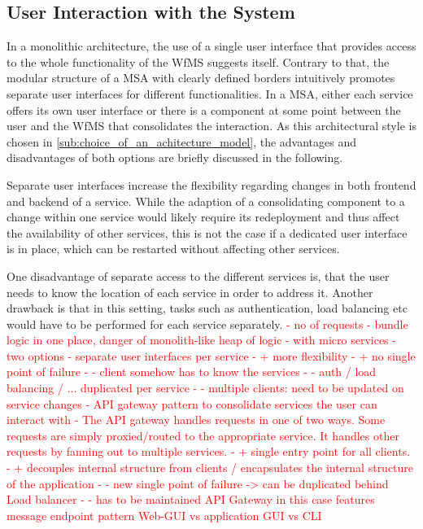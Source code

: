 \subsection{User Interaction with the System} %
\label{sub:user_interaction_with_the_system}
  In a monolithic architecture, the use of a single user interface that provides access to the whole functionality of the \ac{WfMS} suggests itself.
  Contrary to that, the modular structure of a \ac{MSA} with clearly defined borders intuitively promotes separate user interfaces for different functionalities.
  In a \ac{MSA}, either each service offers its own user interface or there is a component at some point between the user and the \ac{WfMS} that consolidates the interaction. As this architectural style is chosen in \ref{sub:choice_of_an_achitecture_model}, the advantages and disadvantages of both options are briefly discussed in the following.

  Separate user interfaces increase the flexibility regarding changes in both frontend and backend of a service. While the adaption of a consolidating component to a change within one service would likely require its redeployment and thus affect the availability of other services, this is not the case if a dedicated user interface is in place, which can be restarted without affecting other services.

  One disadvantage of separate access to the different services is, that the user needs to know the location of each service in order to address it. Another drawback is that in this setting, tasks such as authentication, load balancing etc would have to be performed for each service separately.
\textcolor{red}{
  - no of requests
  - bundle logic in one place, danger of monolith-like heap of logic
  - with micro services
    - two options
      - separate user interfaces per service
        - + more flexibility
        - + no single point of failure
        - - client somehow has to know the services
        - - auth / load balancing / ... duplicated per service
        - - multiple clients: need to be updated on service changes
      - API gateway pattern to consolidate  services the user can interact with
        - The API gateway handles requests in one of two ways. Some requests are simply proxied/routed to the appropriate service. It handles other requests by fanning out to multiple services.
        - + single entry point for all clients.
        - + decouples internal structure from clients / encapsulates the internal structure of the application
        - - new single point of failure
          -> can be duplicated behind Load balancer
        - - has to be maintained
  API Gateway in this case features message endpoint pattern \cite[pp.~95-97]{Hohpe2004Enterprise}
  Web-GUI vs application GUI vs CLI
}
